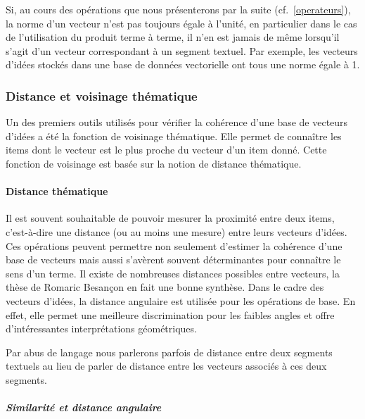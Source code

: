 {Si, au cours des opérations que nous présenterons par la suite
(cf.~\ref{operateurs}), la norme d'un vecteur n'est pas toujours égale
à l'unité, en particulier dans le cas de l'utilisation du produit
terme à terme, il n'en est jamais de même lorsqu'il s'agit d'un
vecteur correspondant à un segment textuel. Par exemple, les vecteurs
d'idées stockés dans une base de données
vectorielle ont tous une norme égale à 1.

\subsubsection{Distance et voisinage thématique}
 

Un des premiers outils utilisés pour vérifier la cohérence d'une base
de vecteurs d'idées a été la fonction de
voisinage thématique. Elle permet de connaître les items dont le
vecteur est le plus proche du vecteur d'un item donné. Cette fonction
de voisinage est basée sur la notion de distance thématique.

\paragraph{Distance thématique} \label{sec:distance-thematique}

Il est souvent souhaitable de pouvoir mesurer la proximité entre deux
items, c'est-à-dire une distance (ou au moins une mesure) entre leurs
vecteurs d'idées. Ces opérations peuvent
permettre non seulement d'estimer la cohérence d'une base de vecteurs
mais aussi s'avèrent souvent déterminantes pour connaître le sens d'un
terme. Il existe de nombreuses distances possibles entre vecteurs, la
thèse de  Romaric Besançon
\cites{Besancon2001}{2.2.5} en fait une bonne synthèse. Dans le cadre
des  vecteurs d'idées, la distance angulaire
est utilisée pour les opérations de base. En effet, elle permet une
meilleure discrimination pour les faibles angles et offre
d'intéressantes interprétations géométriques.

Par abus de langage nous parlerons
parfois de distance entre deux segments textuels au lieu de parler de
distance entre les vecteurs associés à ces deux segments.

\subparagraph{Similarité et distance angulaire}

}
